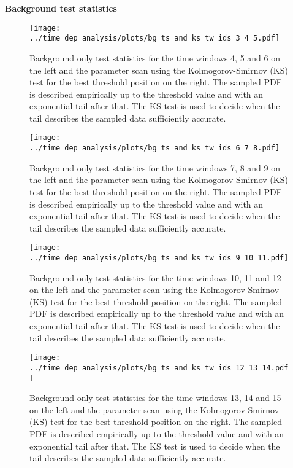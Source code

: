 \textbf{\Large\sffamily Background test statistics}
\begin{figure}[H]
  \centering
  \texttt{[image: ../time\_dep\_analysis/plots/bg\_ts\_and\_ks\_tw\_ids\_3\_4\_5.pdf]}
  \caption[Background-only test statistics for the time windows 4, 5 and 6]{
    Background only test statistics for the time windows 4, 5 and 6 on the left and the parameter scan using the Kolmogorov-Smirnov (KS) test for the best threshold position on the right.
    The sampled PDF is described empirically up to the threshold value and with an exponential tail after that.
    The KS test is used to decide when the tail describes the sampled data sufficiently accurate.
  }
  \label{fig:bg_ts_and_ks_tw_ids_3_4_5}
\end{figure}

\begin{figure}[H]
  \centering
  \texttt{[image: ../time\_dep\_analysis/plots/bg\_ts\_and\_ks\_tw\_ids\_6\_7\_8.pdf]}
  \caption[Background-only test statistics for the time windows 7, 8 and 9]{
    Background only test statistics for the time windows 7, 8 and 9 on the left and the parameter scan using the Kolmogorov-Smirnov (KS) test for the best threshold position on the right.
    The sampled PDF is described empirically up to the threshold value and with an exponential tail after that.
    The KS test is used to decide when the tail describes the sampled data sufficiently accurate.
  }
  \label{fig:bg_ts_and_ks_tw_ids_6_7_8}
\end{figure}

\begin{figure}[H]
  \centering
  \texttt{[image: ../time\_dep\_analysis/plots/bg\_ts\_and\_ks\_tw\_ids\_9\_10\_11.pdf]}
  \caption[Background-only test statistics for the time windows 10, 11 and 12]{
    Background only test statistics for the time windows 10, 11 and 12 on the left and the parameter scan using the Kolmogorov-Smirnov (KS) test for the best threshold position on the right.
    The sampled PDF is described empirically up to the threshold value and with an exponential tail after that.
    The KS test is used to decide when the tail describes the sampled data sufficiently accurate.
  }
  \label{fig:bg_ts_and_ks_tw_ids_9_10_11}
\end{figure}

\begin{figure}[H]
  \centering
  \texttt{[image: ../time\_dep\_analysis/plots/bg\_ts\_and\_ks\_tw\_ids\_12\_13\_14.pdf]}
  \caption[Background-only test statistics for the time windows 13, 14 and 15]{
    Background only test statistics for the time windows 13, 14 and 15 on the left and the parameter scan using the Kolmogorov-Smirnov (KS) test for the best threshold position on the right.
    The sampled PDF is described empirically up to the threshold value and with an exponential tail after that.
    The KS test is used to decide when the tail describes the sampled data sufficiently accurate.
  }
  \label{fig:bg_ts_and_ks_tw_ids_12_13_14}
\end{figure}


